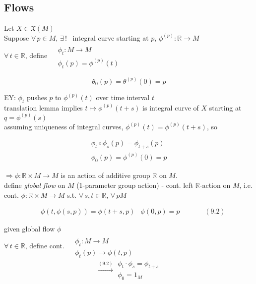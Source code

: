 \subsection*{Flows }


Let $X \in \mathfrak{X}(M)$ \\
Suppose $\forall \, p \in M$, $\exists \, !$ \, integral curve starting at $p$, $\phi^{(p)}: \mathbb{R} \to M$ \\
$\forall \, t \in \mathbb{R}$, define $\begin{aligned} & \quad \\
  & \phi_t: M \to M \\
  & \phi_t(p) = \phi^{(p)}(t) \end{aligned}$

\[
\theta_0(p) = \theta^{(p)}(0) = p
\]

EY: $\phi_t$ pushes $p$ to $\phi^{(p)}(t)$ over time interval $t$ \\

translation lemma implies $t\mapsto \phi^{(p)}(t+s)$ is integral curve of $X$ starting at $q = \phi^{(p)}(s)$  \\

assuming uniqueness of integral curves, $\phi^{(p)}(t) = \phi^{(p)}(t+s)$, so 

\[
\begin{gathered}
  \phi_t \circ \phi_s(p) = \phi_{t+s}(p) \\ 
  \phi_0(p) = \phi^{(p)}(0) = p 
\end{gathered}
\]

$\Longrightarrow \phi : \mathbb{R}\times M \to M$ is an action of additive group $\mathbb{R}$ on $M$.  \\

define \emph{ global flow } on $M$ (1-parameter group action) - cont. left $\mathbb{R}$-action on $M$, i.e. \\
\quad cont. $\phi : \mathbb{R} \times M \to M$ s.t. $\forall \, s,t \in \mathbb{R}$, $\forall \, p M$ 

\begin{equation}
\begin{aligned}
& \phi(t, \phi(s,p) ) = \phi(t+s, p )
& \phi(0,p) = p 
\end{aligned} \quad \quad \quad \, (9.2)
\end{equation}

given global flow $\phi$ \\

$\forall \, t \in \mathbb{R}$, define cont. $\begin{aligned} & \quad \\
  & \phi_t: M \to M \\
  & \phi_t(p) \to \phi(t,p)
\end{aligned}$  
\[
\xrightarrow{ (9.2) } \begin{gathered}
  \phi_t \cdot \phi_s = \phi_{t+s} \\ 
  \phi_0 = 1_M
\end{gathered}
\]

